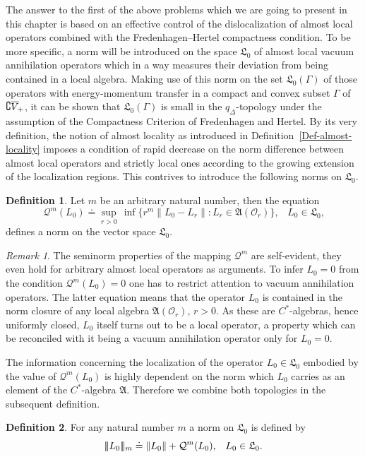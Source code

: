 \documentclass[11pt,twoside,openright]{report}
\theoremstyle{definition}
\newtheorem{Def}{Definition}[chapter]
\theoremstyle{plain}
\theoremstyle{remark}
\newtheorem*{Rem}{Remark}
\theoremstyle{assumption}
\newcommand{\bset}[1]{\bigl\{ #1 \bigr\}}
\newcommand{\norm}[1]{\lVert #1 \rVert}
\newcommand{\Norm}[1]{\lvert \negthinspace \lvert \negthinspace \lvert
  #1 \rvert \negthinspace \rvert \negthinspace \rvert}
\newcommand{\Qm}{\mathcal{Q}^m}
\newcommand{\Qmx}[1]{\mathcal{Q}^m ( #1 )}
\newcommand{\qD}{q_\Delta}
\newcommand{\Afrak}{\mathfrak{A}}
\newcommand{\Lfrak}{\mathfrak{L}}
\newcommand{\fwcone}{\overline{V}_{\negthinspace +}}
\newcommand{\AOr}{\mathfrak{A} ( \mathscr{O}_r )}
\begin{document}
The answer to the first of the above problems which we are going to
present in this chapter is based on an effective control of the
dislocalization of almost local operators combined with the
Fredenhagen--Hertel compactness condition. To be more specific, a norm
will be introduced on the space $\Lfrak_0$ of almost local vacuum
annihilation operators which in a way measures their deviation from
being contained in a local algebra. Making use of this norm on the set
$\Lfrak_0 ( \Gamma )$ of those operators with energy-momentum transfer
in a compact and convex subset $\Gamma$ of $\complement \fwcone$, it
can be shown that $\Lfrak_0 ( \Gamma )$ is small in the $\qD$-topology
under the assumption of the Compactness Criterion of Fredenhagen and
Hertel. By its very definition, the notion of almost locality as
introduced in Definition~\ref{Def-almost-locality} imposes a condition
of rapid decrease on the norm difference between almost local
operators and strictly local ones according to the growing extension
of the localization regions. This contrives to introduce the following
norms on $\Lfrak_0$.
\begin{Def}
  \label{Def-disloc-norm}
  Let $m$ be an arbitrary natural number, then the equation
  \begin{equation}
    \label{eq-disloc-norm}
    \Qmx{L_0} \doteq \sup_{r > 0} \, \inf \bset{r^m \norm{L_0 - L_r} :
      L_r \in \AOr} \text{,} \quad L_0 \in \Lfrak_0 \text{,}
  \end{equation}
  defines a norm on the vector space $\Lfrak_0$.
\end{Def}
\begin{Rem}
  The seminorm properties of the mapping $\Qm$ are self-evident, they
  even hold for arbitrary almost local operators as arguments. To
  infer $L_0 = 0$ from the condition $\Qmx{L_0} = 0$ one has to
  restrict attention to vacuum annihilation operators. The latter
  equation means that the operator $L_0$ is contained in the norm
  closure of any local algebra $\AOr$, $r > 0$. As these are
  $C^*$-algebras, hence uniformly closed, $L_0$ itself turns out to be
  a local operator, a property which can be reconciled with it being a
  vacuum annihilation operator only for $L_0 = 0$.
\end{Rem}
The information concerning the localization of the operator $L_0 \in
\Lfrak_0$ embodied by the value of $\Qmx{L_0}$ is highly dependent on
the norm which $L_0$ carries as an element of the $C^*$-algebra
$\Afrak$. Therefore we combine both topologies in the subsequent
definition.
\begin{Def}
  \label{Def-comb-disloc-norm}
  For any natural number $m$ a norm on $\Lfrak_0$ is defined by
  \begin{equation}
    \label{eq-comb-disloc-norm}
    \Norm{L_0}_m \doteq \norm{L_0} + \Qmx{L_0} \text{,} \quad L_0 \in
    \Lfrak_0 \text{.}
  \end{equation}
\end{Def}
\end{document}
